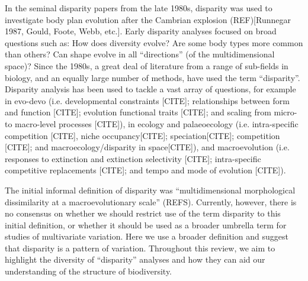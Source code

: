 \documentclass[12pt,letterpaper]{article}
\begin{document}
In the seminal disparity papers from the late 1980s, disparity was used to investigate body plan evolution after the Cambrian explosion (REF)[Runnegar 1987, Gould, Foote, Webb, etc.].
Early disparity analyses focused on broad questions such as: How does diversity evolve? Are some body types more common than others? Can shape evolve in all ``directions'' (of the multidimensional space)?
Since the 1980s, a great deal of literature from a range of sub-fields in biology, and an equally large number of methods, have used the term ``disparity''.
Disparity analysis has been used to tackle a vast array of questions, for example in evo-devo (i.e. developmental constraints [CITE]; relationships between form and function [CITE]; evolution functional traits [CITE]; and scaling from micro- to macro-level processes [CITE]), in ecology and palaeoecology (i.e. intra-specific competition [CITE], niche occupancy[CITE]; speciation[CITE]; competition [CITE]; and macroecology/disparity in space[CITE]), and macroevolution (i.e. responses to extinction and extinction selectivity [CITE]; intra-specific competitive replacements [CITE]; and tempo and mode of evolution [CITE]).

The initial informal definition of disparity was ``multidimensional morphological dissimilarity at a macroevolutionary scale'' (REFS).
Currently, however, there is no consensus on whether we should restrict use of the term disparity to this initial definition, or whether it should be used as a broader umbrella term for studies of multivariate variation. 
Here we use a broader definition and suggest that disparity is a pattern of variation.
Throughout this review, we aim to highlight the diversity of ``disparity'' analyses and how they can aid our understanding of the structure of biodiversity.
\end{document}
